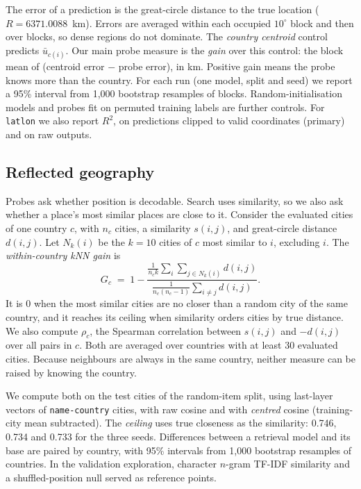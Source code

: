 The error of a prediction is the great-circle distance to the true location ($R=6371.0088$~km). Errors are averaged within each occupied $10^\circ$ block and then over blocks, so dense regions do not dominate. The \emph{country centroid} control predicts $\bar u_{c(i)}$. Our main probe measure is the \emph{gain} over this control: the block mean of (centroid error $-$ probe error), in km. Positive gain means the probe knows more than the country. For each run (one model, split and seed) we report a 95\% interval from 1,000 bootstrap resamples of blocks. Random-initialisation models and probes fit on permuted training labels are further controls. For \texttt{latlon} we also report $R^2$, on predictions clipped to valid coordinates (primary) and on raw outputs.

\subsection{Reflected geography}
\label{sec:method-reflected}

Probes ask whether position is decodable. Search uses similarity, so we also ask whether a place's most similar places are close to it. Consider the evaluated cities of one country $c$, with $n_c$ cities, a similarity $s(i,j)$, and great-circle distance $d(i,j)$. Let $N_k(i)$ be the $k=10$ cities of $c$ most similar to $i$, excluding $i$. The \emph{within-country kNN gain} is
\begin{equation}
G_c \;=\; 1-\frac{\frac{1}{n_c k}\sum_{i}\sum_{j\in N_k(i)} d(i,j)}{\frac{1}{n_c(n_c-1)}\sum_{i\neq j} d(i,j)}.
\label{eq:knn-gain}
\end{equation}
It is 0 when the most similar cities are no closer than a random city of the same country, and it reaches its ceiling when similarity orders cities by true distance. We also compute $\rho_c$, the Spearman correlation between $s(i,j)$ and $-d(i,j)$ over all pairs in $c$. Both are averaged over countries with at least 30 evaluated cities. Because neighbours are always in the same country, neither measure can be raised by knowing the country.

We compute both on the test cities of the random-item split, using last-layer vectors of \texttt{name-country} cities, with raw cosine and with \emph{centred} cosine (training-city mean subtracted). The \emph{ceiling} uses true closeness as the similarity: 0.746, 0.734 and 0.733 for the three seeds. Differences between a retrieval model and its base are paired by country, with 95\% intervals from 1,000 bootstrap resamples of countries. In the validation exploration, character $n$-gram TF-IDF similarity and a shuffled-position null served as reference points.

